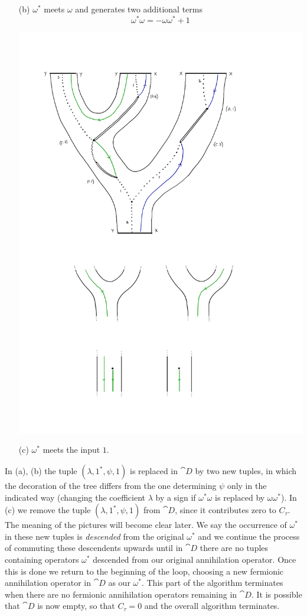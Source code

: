 \documentclass[english,letter paper,12pt,leqno]{article}
\theoremstyle{example}
\numberwithin{equation}{section}
\begin{document}
\begin{itemize}
\item[(b)] $\omega^*$ meets $\omega$ and generates two additional terms
\[
\omega^* \omega = - \omega \omega^* + 1
\]
\begin{center}
\includegraphics[scale=0.6]{dia21}
\end{center}

\item[(c)] $\omega^*$ meets the input $1$.
\end{itemize}
In (a), (b) the tuple $(\lambda, 1^*, \psi, 1)$ is replaced in $\cat{D}$ by two new tuples, in which the decoration of the tree differs from the one determining $\psi$ only in the indicated way (changing the coefficient $\lambda$ by a sign if $\omega^* \omega$ is replaced by $\omega \omega^*$). In (c) we remove the tuple $(\lambda, 1^*, \psi, 1)$ from $\cat{D}$, since it contributes zero to $C_\tau$. The meaning of the pictures will become clear later. We say the occurrence of $\omega^*$ in these new tuples is \emph{descended} from the original $\omega^*$ and we continue the process of commuting these descendents upwards until in $\cat{D}$ there are no tuples containing operators $\omega^*$ descended from our original annihilation operator. Once this is done we return to the beginning of the loop, choosing a new fermionic annihilation operator in $\cat{D}$ as our $\omega^*$. This part of the algorithm terminates when there are no fermionic annihilation operators remaining in $\cat{D}$. It is possible that $\cat{D}$ is now empty, so that $C_\tau = 0$ and the overall algorithm terminates.
\end{document}
